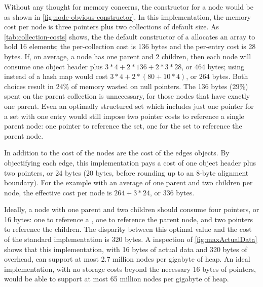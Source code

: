 Without any thought for memory concerns, the constructor for a node would be as
shown in \autoref{fig:node-obvious-constructor}. In this implementation, the
memory cost per node is three pointers plus two collections of default size. As
\autoref{tab:collection-costs} shows, the the default constructor of a
 allocates an array to hold 16 elements; the per-collection cost
is 136 bytes and the per-entry cost is 28 bytes. If, on average, a node has one
parent and 2 children, then each node will consume one object header plus $3*4
+2*136 + 2*3*28$, or $464$ bytes; using  instead of a hash map
would cost $3*4+ 2*(80 + 10*4)$, or $264$ bytes. Both choices result in 24\% of
memory wasted on null pointers.
The 136 bytes (29\%) spent on the parent collection is unnecessary, for those
nodes that have exactly one parent. Even an optimally structured set which
includes just one pointer for a set with one entry would still impose two pointer
costs to reference a single parent node: one pointer to reference the set, one
for the set to reference the parent node.

In addition to the cost of the nodes are the cost of the edges objects. By
objectifying each edge, this implementation pays a cost of one object header
plus two pointers, or 24 bytes (20 bytes, before rounding up to an 8-byte
alignment boundary). For the example with an average of one parent and two
children per node, the effective cost per node is $264 + 3*24$, or $336$ bytes.

Ideally, a node with one parent and two children should consume four pointers, or
16 bytes: one to reference a , one to reference the parent node, and
two pointers to reference the children. The disparity between this optimal value
and the cost of the standard implementation is 320 bytes. A inspection of
\autoref{fig:maxActualData} shows that this implementation, with 16 bytes of
actual data and 320 bytes of overhead, can support at most 2.7 million nodes per
gigabyte of heap. An ideal implementation, with no storage costs beyond the
necessary 16 bytes of pointers, would be able to support at most 65 million nodes
per gigabyte of heap.

